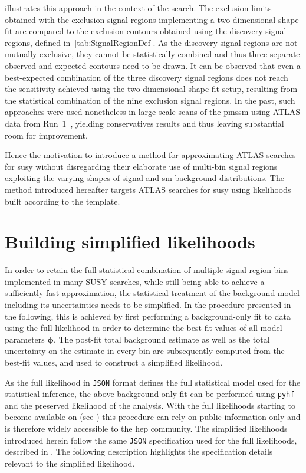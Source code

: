  illustrates this approach in the context of the \onelepton search. The exclusion limits obtained with the exclusion signal regions implementing a two-dimensional shape-fit are compared to the exclusion contours obtained using the discovery signal regions, defined in~\cref{tab:SignalRegionDef}.
As the discovery signal regions are not mutually exclusive, they cannot be statistically combined and thus three separate observed and expected contours need to be drawn. It can be observed that even a best-expected combination of the three discovery signal regions does not reach the sensitivity achieved using the two-dimensional shape-fit setup, resulting from the statistical combination of the nine exclusion signal regions.
In the past, such approaches were used nonetheless in large-scale scans of the \gls{pmssm} using ATLAS data from Run~1~\cite{pMSSM-scan-run1:2015baa,Aaboud:2016wna}, yielding conservatives results and thus leaving substantial room for improvement.

Hence the motivation to introduce a method for approximating ATLAS searches for \gls{susy} without disregarding their elaborate use of multi-bin signal regions exploiting the varying shapes of signal and \gls{sm} background distributions. The method introduced hereafter targets ATLAS searches for \gls{susy} using likelihoods built according to the  template.

\section{Building simplified likelihoods}\label{sec:building_simplified_likelihoods}

In order to retain the full statistical combination of multiple signal region bins implemented in many SUSY searches, while still being able to achieve a sufficiently fast approximation, the statistical treatment of the background model including its uncertainties needs to be simplified.
In the procedure presented in the following, this is achieved by first performing a background-only fit to data using the full likelihood in order to determine the best-fit values of all model parameters $\boldsymbol{\phi}$.
The post-fit total background estimate as well as the total uncertainty on the estimate in every bin are subsequently computed from the best-fit values, and used to construct a simplified likelihood.

As the full likelihood in \texttt{JSON} format defines the full statistical model used for the statistical inference, the above background-only fit can be performed using \texttt{pyhf} and the preserved likelihood of the analysis.
With the full likelihoods starting to become available on  (see \eg {}\cite{fullLH_1Lbb}) this procedure can rely on public information only and is therefore widely accessible to the \gls{hep} community.
The simplified likelihoods introduced herein follow the same \texttt{JSON} specification used for the full likelihoods, described in \cite{ATL-PHYS-PUB-2019-029}.
The following description highlights the specification details relevant to the simplified likelihood. 

